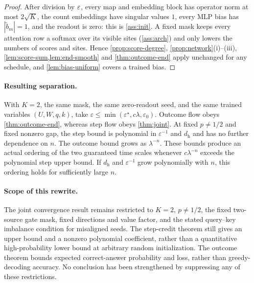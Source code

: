 \begin{proof}
After division by $\varepsilon$, every map and embedding block has operator norm at most $2\sqrt K$, the count embeddings have singular values
$1$, every MLP bias has $|\tilde b_m|=1$, and the readout is zero: this is \cref{ass:init}. A fixed mask keeps every attention row a softmax over
its visible sites (\cref{ass:arch}) and only lowers the numbers of scores and sites. Hence \cref{prop:score-degree}, \cref{prop:network}(i)--(iii),
\cref{lem:score-sum,lem:end-smooth} and \cref{thm:outcome-end} apply unchanged for any schedule, and \cref{lem:bias-uniform} covers a trained bias.
\end{proof}


\paragraph{Resulting separation.} With $K=2$, the same mask, the same zero-readout seed, and the same trained variables $(U,W,q,k)$, take $\varepsilon\le\min(\varepsilon^\star,c\lambda,\varepsilon_0)$. Outcome flow obeys \cref{thm:outcome-end}, whereas step flow obeys \cref{thm:joint}. At fixed $p\ne1/2$ and fixed nonzero gap, the step bound is polynomial in $\varepsilon^{-1}$ and $d_{\mathrm h}$ and has no further dependence on $n$. The outcome bound grows as $\lambda^{-n}$. These bounds produce an actual ordering of the two guaranteed time scales whenever $c\lambda^{-n}$ exceeds the polynomial step upper bound. If $d_{\mathrm h}$ and $\varepsilon^{-1}$ grow polynomially with $n$, this ordering holds for sufficiently large $n$.

\paragraph{Scope of this rewrite.} The joint convergence result remains restricted to $K=2$, $p\ne1/2$, the fixed two-source gate mask, fixed directions and value factor, and the stated query--key imbalance condition for misaligned seeds. The step-credit theorem still gives an upper bound and a nonzero polynomial coefficient, rather than a quantitative high-probability lower bound at arbitrary random initialization. The outcome theorem bounds expected correct-answer probability and loss, rather than greedy-decoding accuracy. No conclusion has been strengthened by suppressing any of these restrictions.
